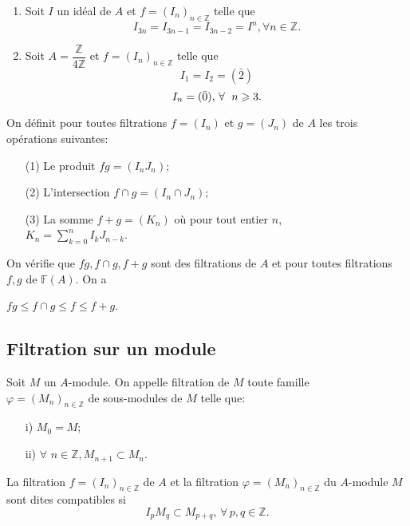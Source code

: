 \begin{monexemples}
	\begin{enumerate}
		\item Soit $I$ un idéal de $A$ et $f=(I_n)_{n \in \mathbb{Z}}$ telle que
		$$I_{3n} = I_{3n-1} = I_{3n-2} =I^{n},  \forall   n \in \mathbb{Z}. $$
		\item Soit $A = \dfrac{\mathbb{Z}}{4 \mathbb{Z}} $ et $f=(I_n)_{n \in \mathbb{Z}}$ telle que
		$$I_1 = I_2 = (\bar{2})$$
		$$I_n = (\bar{0})  \text{, $ \forall $ } \; n \geqslant 3. $$
	\end{enumerate}
\end{monexemples}
\begin{madefinition}
	On définit pour toutes filtrations $f=(I_n)$ et $g=(J_n)$ de $A$ les trois opérations suivantes: 
	\begin{enumerate}
		\item[(1)] Le produit $fg=(I_nJ_n)$;
		\item[(2)] L'intersection $f \cap g = (I_n \cap J_n)$;
		\item[(3)] La somme $f+g=(K_n)$ où pour tout entier $n$, \\ $K_n =\displaystyle  \sum_{k=0}^{n}I_{k}J_{n-k} $.
	\end{enumerate}
	On vérifie que $fg, f \cap g, f + g$ sont des filtrations de $A$ et pour toutes filtrations \\ $f,g$ de $\mathbb{F}(A)$. On a
	\begin{center}
		$fg \leqslant f \cap g \leqslant f \leqslant f+g$.
	\end{center}
\end{madefinition}

\subsection{Filtration sur un module}
\begin{madefinition}
	Soit $M$ un $A$-module. On appelle filtration de $M$ toute famille \\ $\varphi = (M_n)_{n \in \mathbb{Z}}$ de sous-modules de $M$ telle que:
	\begin{enumerate}
		\item[i)] $M_0 = M$;
		\item[ii)] $ \forall $  $n \in \mathbb{Z}, M_{n+1} \subset M_n$.
	\end{enumerate}
	
	La filtration $f = (I_n)_{n \in \mathbb{Z}}$ de $A$ et la filtration $\varphi = (M_n)_{n \in \mathbb{Z}}$ du $A$-module $M$ sont dites compatibles si
	\[ I_p M_q \subset M_{p+q} ,\, \forall \, p, q \in \mathbb{Z}. \]
\end{madefinition}
